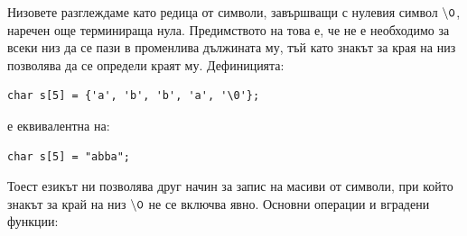 \documentclass{article}
\begin{document}
Низовете разглеждаме като редица от символи, завършващи с нулевия символ $\backslash\textcolor{black}{\texttt{0}}$, наречен още терминираща нула. Предимството
на това е, че не е необходимо за всеки низ да се пази в променлива дължината му, тъй като знакът за края на низ позволява да се
определи краят му.
Дефиницията:
\begin{lstlisting}[style=cpp]
char s[5] = {'a', 'b', 'b', 'a', '\0'};
\end{lstlisting}
е еквивалентна на:
\begin{lstlisting}[style=cpp]
char s[5] = "abba";
\end{lstlisting}
Тоест езикът ни позволява друг начин за запис на масиви от символи, при който знакът за край на низ $\backslash\textcolor{black}{\texttt{0}}$ не се включва явно. \newline\newline
Основни операции и вградени функции:
\end{document}
